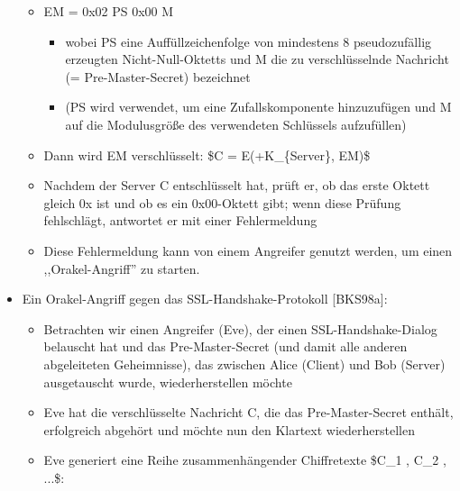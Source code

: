 \documentclass[a4paper]{article}
\begin{document}
\begin{multicols}{3}
\begin{itemize}
              \begin{itemize}
                  \item
                        EM = 0x02 \textbar{} PS \textbar{} 0x00 \textbar{} M

                        \begin{itemize}
                            \item
                                  wobei PS eine Auffüllzeichenfolge von mindestens 8 pseudozufällig
                                  erzeugten Nicht-Null-Oktetts und M die zu verschlüsselnde
                                  Nachricht (= Pre-Master-Secret) bezeichnet
                            \item
                                  (PS wird verwendet, um eine Zufallskomponente hinzuzufügen und M
                                  auf die Modulusgröße des verwendeten Schlüssels aufzufüllen)
                        \end{itemize}
                  \item
                        Dann wird EM verschlüsselt: \$C = E(+K\_\{Server\}, EM)\$
                  \item
                        Nachdem der Server C entschlüsselt hat, prüft er, ob das erste
                        Oktett gleich 0x ist und ob es ein 0x00-Oktett gibt; wenn diese
                        Prüfung fehlschlägt, antwortet er mit einer Fehlermeldung
                  \item
                        Diese Fehlermeldung kann von einem Angreifer genutzt werden, um
                        einen ,,Orakel-Angriff'' zu starten.
              \end{itemize}
        \item
              Ein Orakel-Angriff gegen das SSL-Handshake-Protokoll {[}BKS98a{]}:

              \begin{itemize}
                  \item
                        Betrachten wir einen Angreifer (Eve), der einen SSL-Handshake-Dialog
                        belauscht hat und das Pre-Master-Secret (und damit alle anderen
                        abgeleiteten Geheimnisse), das zwischen Alice (Client) und Bob
                        (Server) ausgetauscht wurde, wiederherstellen möchte
                  \item
                        Eve hat die verschlüsselte Nachricht C, die das Pre-Master-Secret
                        enthält, erfolgreich abgehört und möchte nun den Klartext
                        wiederherstellen
                  \item
                        Eve generiert eine Reihe zusammenhängender Chiffretexte \$C\_1 ,
                        C\_2 , ...\$:


\end{itemize}
\end{itemize}
\end{multicols}
\end{document}
